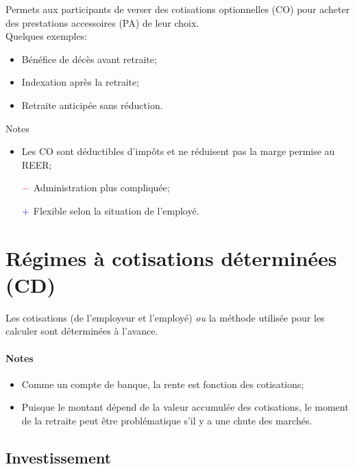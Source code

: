 \documentclass[10pt, french]{article}
\begin{document}
\begin{multicols*}{3}
\begin{definitionNOHFILL}
Permets aux participants de verser des cotisations optionnelles (CO) pour acheter des prestations accessoires (PA) de leur choix.\\

Quelques exemples:
\begin{itemize}[leftmargin = *]
	\item	Bénéfice de décès avant retraite;
	\item	Indexation après la retraite;
	\item	Retraite anticipée sans réduction.
\end{itemize}

Notes
\begin{itemize}[leftmargin = *]
	\item	Les CO sont déductibles d'impôts et ne réduisent pas la marge permise au REER;
	\item[$\color{red}-$]	Administration plus compliquée;
	\item[$\color{blue}+$]	Flexible selon la situation de l'employé.
\end{itemize}
\end{definitionNOHFILL}

\columnbreak

\section*{Régimes à cotisations déterminées (CD)}

\begin{definitionNOHFILL}[Description]
Les cotisations (de l'employeur et l'employé) \textit{ou} la méthode utilisée pour les calculer sont déterminées à l'avance.

\paragraph{Notes}
\begin{itemize}[leftmargin = *]
	\item	Comme un compte de banque, la rente est fonction des cotisations;
	\item	Puisque le montant dépend de la valeur accumulée des cotisations, le moment de la retraite peut être problématique s'il y a une chute des marchés.
\end{itemize}
\end{definitionNOHFILL}


\subsection*{Investissement}


\end{multicols*}
\end{document}
